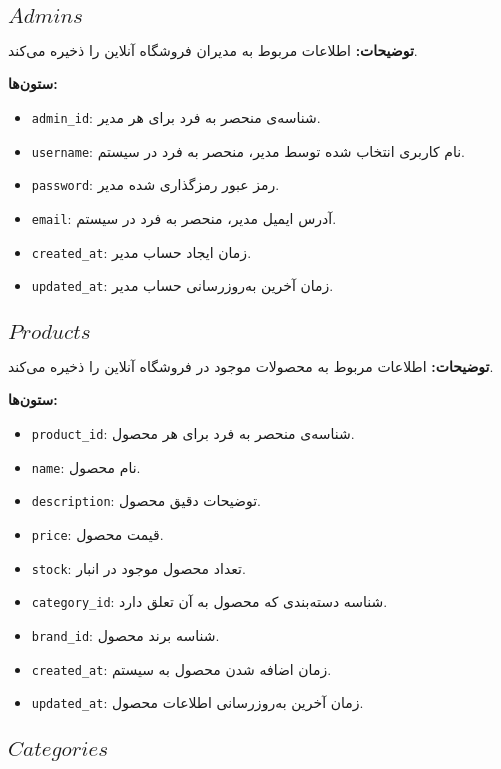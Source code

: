 \documentclass[12pt]{article}
\begin{document}
\subsection{\(Admins\)}

\textbf{توضیحات:} اطلاعات مربوط به مدیران فروشگاه آنلاین را ذخیره می‌کند.

\textbf{ستون‌ها:}
\begin{itemize}
    \item \texttt{admin\_id}: شناسه‌ی منحصر به فرد برای هر مدیر.
    \item \texttt{username}: نام کاربری انتخاب شده توسط مدیر، منحصر به فرد در سیستم.
    \item \texttt{password}: رمز عبور رمزگذاری شده مدیر.
    \item \texttt{email}: آدرس ایمیل مدیر، منحصر به فرد در سیستم.
    \item \texttt{created\_at}: زمان ایجاد حساب مدیر.
    \item \texttt{updated\_at}: زمان آخرین به‌روزرسانی حساب مدیر.
\end{itemize}

\subsection{\(Products\)}

\textbf{توضیحات:} اطلاعات مربوط به محصولات موجود در فروشگاه آنلاین را ذخیره می‌کند.

\textbf{ستون‌ها:}
\begin{itemize}
    \item \texttt{product\_id}: شناسه‌ی منحصر به فرد برای هر محصول.
    \item \texttt{name}: نام محصول.
    \item \texttt{description}: توضیحات دقیق محصول.
    \item \texttt{price}: قیمت محصول.
    \item \texttt{stock}: تعداد محصول موجود در انبار.
    \item \texttt{category\_id}: شناسه دسته‌بندی که محصول به آن تعلق دارد.
    \item \texttt{brand\_id}: شناسه برند محصول.
    \item \texttt{created\_at}: زمان اضافه شدن محصول به سیستم.
    \item \texttt{updated\_at}: زمان آخرین به‌روزرسانی اطلاعات محصول.
\end{itemize}

\subsection{\(Categories\)}
\end{document}
